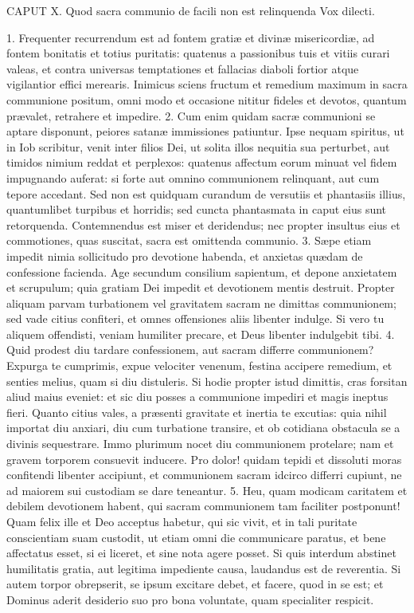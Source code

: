 CAPUT X.
Quod sacra communio de facili non est relinquenda
Vox dilecti.

1. Frequenter recurrendum est ad fontem gratiæ et divinæ misericordiæ, ad fontem bonitatis et totius puritatis: quatenus a passionibus tuis et vitiis curari valeas, et contra universas temptationes et fallacias diaboli fortior atque vigilantior effici merearis. Inimicus sciens fructum et remedium maximum in sacra communione positum, omni modo et occasione nititur fideles et devotos, quantum prævalet, retrahere et impedire.
2. Cum enim quidam sacræ communioni se aptare disponunt, peiores satanæ immissiones patiuntur. Ipse nequam spiritus, ut in Iob scribitur, venit inter filios Dei, ut solita illos nequitia sua perturbet, aut timidos nimium reddat et perplexos: quatenus affectum eorum minuat vel fidem impugnando auferat: si forte aut omnino communionem relinquant, aut cum tepore accedant. Sed non est quidquam curandum de versutiis et phantasiis illius, quantumlibet turpibus et horridis; sed cuncta phantasmata in caput eius sunt retorquenda. Contemnendus est miser et deridendus; nec propter insultus eius et commotiones, quas suscitat, sacra est omittenda communio.
3. Sæpe etiam impedit nimia sollicitudo pro devotione habenda, et anxietas quædam de confessione facienda. Age secundum consilium sapientum, et depone anxietatem et scrupulum; quia gratiam Dei impedit et devotionem mentis destruit. Propter aliquam parvam turbationem vel gravitatem sacram ne dimittas communionem; sed vade citius confiteri, et omnes offensiones aliis libenter indulge. Si vero tu aliquem offendisti, veniam humiliter precare, et Deus libenter indulgebit tibi.
4. Quid prodest diu tardare confessionem, aut sacram differre communionem? Expurga te cumprimis, expue velociter venenum, festina accipere remedium, et senties melius, quam si diu distuleris. Si hodie propter istud dimittis, cras forsitan aliud maius eveniet: et sic diu posses a communione impediri et magis ineptus fieri. Quanto citius vales, a præsenti gravitate et inertia te excutias: quia nihil importat diu anxiari, diu cum turbatione transire, et ob cotidiana obstacula se a divinis sequestrare. Immo plurimum nocet diu communionem protelare; nam et gravem torporem consuevit inducere. Pro dolor! quidam tepidi et dissoluti moras confitendi libenter accipiunt, et communionem sacram idcirco differri cupiunt, ne ad maiorem sui custodiam se dare teneantur.
5. Heu, quam modicam caritatem et debilem devotionem habent, qui sacram communionem tam faciliter postponunt! Quam felix ille et Deo acceptus habetur, qui sic vivit, et in tali puritate conscientiam suam custodit, ut etiam omni die communicare paratus, et bene affectatus esset, si ei liceret, et sine nota agere posset. Si quis interdum abstinet humilitatis gratia, aut legitima impediente causa, laudandus est de reverentia. Si autem torpor obrepserit, se ipsum excitare debet, et facere, quod in se est; et Dominus aderit desiderio suo pro bona voluntate, quam specialiter respicit.
